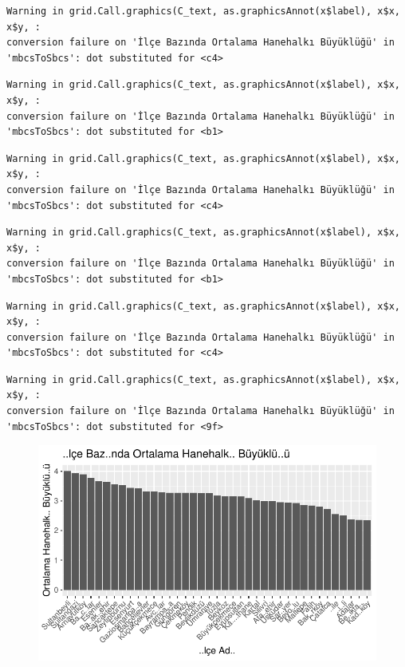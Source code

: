 \documentclass[
  11pt,
  a4paper,
  DIV=11,
  numbers=noendperiod]{scrartcl}
\begin{document}
\begin{verbatim}
Warning in grid.Call.graphics(C_text, as.graphicsAnnot(x$label), x$x, x$y, :
conversion failure on 'İlçe Bazında Ortalama Hanehalkı Büyüklüğü' in
'mbcsToSbcs': dot substituted for <c4>
\end{verbatim}

\begin{verbatim}
Warning in grid.Call.graphics(C_text, as.graphicsAnnot(x$label), x$x, x$y, :
conversion failure on 'İlçe Bazında Ortalama Hanehalkı Büyüklüğü' in
'mbcsToSbcs': dot substituted for <b1>
\end{verbatim}

\begin{verbatim}
Warning in grid.Call.graphics(C_text, as.graphicsAnnot(x$label), x$x, x$y, :
conversion failure on 'İlçe Bazında Ortalama Hanehalkı Büyüklüğü' in
'mbcsToSbcs': dot substituted for <c4>
\end{verbatim}

\begin{verbatim}
Warning in grid.Call.graphics(C_text, as.graphicsAnnot(x$label), x$x, x$y, :
conversion failure on 'İlçe Bazında Ortalama Hanehalkı Büyüklüğü' in
'mbcsToSbcs': dot substituted for <b1>
\end{verbatim}

\begin{verbatim}
Warning in grid.Call.graphics(C_text, as.graphicsAnnot(x$label), x$x, x$y, :
conversion failure on 'İlçe Bazında Ortalama Hanehalkı Büyüklüğü' in
'mbcsToSbcs': dot substituted for <c4>
\end{verbatim}

\begin{verbatim}
Warning in grid.Call.graphics(C_text, as.graphicsAnnot(x$label), x$x, x$y, :
conversion failure on 'İlçe Bazında Ortalama Hanehalkı Büyüklüğü' in
'mbcsToSbcs': dot substituted for <9f>
\end{verbatim}

\begin{figure}[H]

{\centering \includegraphics{project_files/figure-pdf/unnamed-chunk-15-1.pdf}

}

\end{figure}
\end{document}
